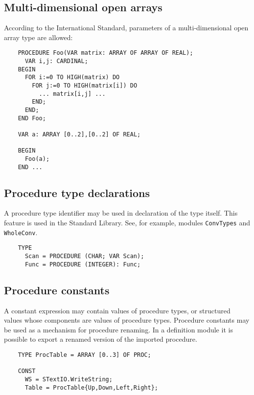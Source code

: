 \subsection{Multi-dimensional open arrays}

According to the International Standard, parameters of a
multi-dimensional open array type are allowed:

\begin{verbatim}
    PROCEDURE Foo(VAR matrix: ARRAY OF ARRAY OF REAL);
      VAR i,j: CARDINAL;
    BEGIN
      FOR i:=0 TO HIGH(matrix) DO
        FOR j:=0 TO HIGH(matrix[i]) DO
          ... matrix[i,j] ...
        END;
      END;
    END Foo;

    VAR a: ARRAY [0..2],[0..2] OF REAL;

    BEGIN
      Foo(a);
    END ...
\end{verbatim}

\subsection{Procedure type declarations}\label{m2:ISO:proc_dcl}

A procedure type identifier may be used in declaration of the type itself.
This feature is used in the Standard Library. See, for example,
modules {\tt ConvTypes} and {\tt WholeConv}.

\begin{verbatim}
    TYPE
      Scan = PROCEDURE (CHAR; VAR Scan);
      Func = PROCEDURE (INTEGER): Func;
\end{verbatim}

\subsection{Procedure constants}\label{m2:ISO:proc_const}

A constant expression may contain values of procedure types, or
structured values whose components are values of procedure types.
Procedure constants may be used as a mechanism for procedure
renaming. In a definition module it is possible to export a renamed
version of the imported procedure.

\Examples
\begin{verbatim}
    TYPE ProcTable = ARRAY [0..3] OF PROC;

    CONST
      WS = STextIO.WriteString;
      Table = ProcTable{Up,Down,Left,Right};
\end{verbatim}

